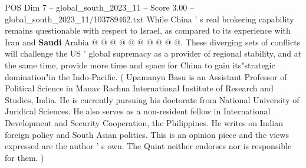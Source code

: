 \begin{textsample}{POS Dim 7 – global\_south\_2023\_11 – Score 3.00 – global\_south\_2023\_11/103789462.txt}
While China ' s real brokering capability remains questionable with respect to Israel, as compared to its experience with Iran and \textbf{Saudi} Arabia @ @ @ @ @ @ @ @ @ @.
These diverging sets of conflicts will challenge the US ' global supremacy as a provider of regional stability, and at the same time, provide more time and space for China to gain its"strategic domination"in the Indo-Pacific. ( Upamanyu Basu is an Assistant Professor of Political Science in Manav Rachna International Institute of Research and Studies, India.
He is currently pursuing his doctorate from National University of Juridical Sciences.
He also serves as a non-resident fellow in International Development and Security Cooperation, the Philippines.
He writes on Indian foreign policy and South Asian politics.
This is an opinion piece and the views expressed are the author ' s own.
The Quint neither endorses nor is responsible for them. )

\end{textsample}

